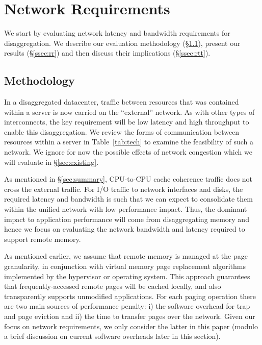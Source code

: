 \section{\dis Network Requirements}
\label{sec:requirements}



We start by evaluating network latency and bandwidth requirements for disaggregation.
We describe our evaluation methodology (\S\ref{ssec:rmethod}), present our results (\S\ref{ssec:rr}) and then discuss their implications (\S\ref{ssec:rtt}). 

\subsection{Methodology}
\label{ssec:rmethod}
In a disaggregated datacenter, traffic between resources that was contained within a server is now carried on the “external” network. As with other types of interconnects, the key requirement will be low latency and high throughput to enable this disaggregation. We review the forms of communication between resources within a server in Table~\ref{tab:tech} to examine the feasibility of such a network. 
We ignore for now the possible effects of network congestion which we will evaluate in \S\ref{sec:existing}.

As mentioned in \S\ref{sec:summary}, CPU-to-CPU cache coherence traffic does not cross the external traffic.
For I/O traffic to network interfaces and disks, the required latency and bandwidth is such that we can expect to consolidate them within the unified network with low performance impact. 
Thus, the dominant impact to application performance will come from disaggregating memory and hence we focus on evaluating the network bandwidth and latency required to support remote memory.

As mentioned earlier, we assume that remote memory is managed at the page granularity, in conjunction with virtual memory page replacement algorithms implemented by the hypervisor or operating system. This approach guarantees that frequently-accessed remote pages will be cached locally, and also transparently supports unmodified applications.
For each paging operation there are two main sources 
of performance penalty: i) the software overhead for trap and page eviction and ii) the time to transfer pages over the network. 
Given our focus on network requirements, we only consider the latter in this paper (modulo a brief discussion on current 
software overheads later in this section).

